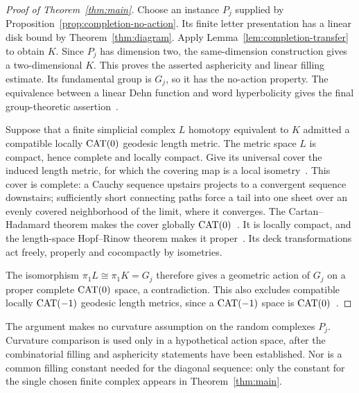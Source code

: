 \begin{proof}[Proof of Theorem~\ref{thm:main}]
Choose an instance $P_j$ supplied by Proposition~\ref{prop:completion-no-action}. Its finite letter presentation has a linear disk bound by Theorem~\ref{thm:diagram}. Apply Lemma~\ref{lem:completion-transfer} to obtain $K$. Since $P_j$ has dimension two, the same-dimension construction gives a two-dimensional $K$. This proves the asserted asphericity and linear filling estimate. Its fundamental group is $G_j$, so it has the no-action property. The equivalence between a linear Dehn function and word hyperbolicity gives the final group-theoretic assertion~\cite[Exercise~III.H.2.5(5), Proposition~III.H.2.7, and Theorem~III.H.2.9]{BH1999}.

Suppose that a finite simplicial complex $L$ homotopy equivalent to $K$ admitted a compatible locally $\operatorname{CAT}(0)$ geodesic length metric. The metric space $L$ is compact, hence complete and locally compact. Give its universal cover the induced length metric, for which the covering map is a local isometry~\cite[Proposition~I.3.25]{BH1999}. This cover is complete: a Cauchy sequence upstairs projects to a convergent sequence downstairs; sufficiently short connecting paths force a tail into one sheet over an evenly covered neighborhood of the limit, where it converges. The Cartan--Hadamard theorem makes the cover globally $\operatorname{CAT}(0)$~\cite[Theorem~II.4.1(2)]{BH1999}. It is locally compact, and the length-space Hopf--Rinow theorem makes it proper~\cite[Proposition~I.3.7]{BH1999}. Its deck transformations act freely, properly and cocompactly by isometries.

The isomorphism $\pi_1L\cong\pi_1K=G_j$ therefore gives a geometric action of $G_j$ on a proper complete $\operatorname{CAT}(0)$ space, a contradiction. This also excludes compatible locally $\operatorname{CAT}(-1)$ geodesic length metrics, since a $\operatorname{CAT}(-1)$ space is $\operatorname{CAT}(0)$~\cite[Theorem~II.1.12(1)]{BH1999}.
\end{proof}

\begin{remark}
The argument makes no curvature assumption on the random complexes $P_j$. Curvature comparison is used only in a hypothetical action space, after the combinatorial filling and asphericity statements have been established. Nor is a common filling constant needed for the diagonal sequence: only the constant for the single chosen finite complex appears in Theorem~\ref{thm:main}.
\end{remark}
